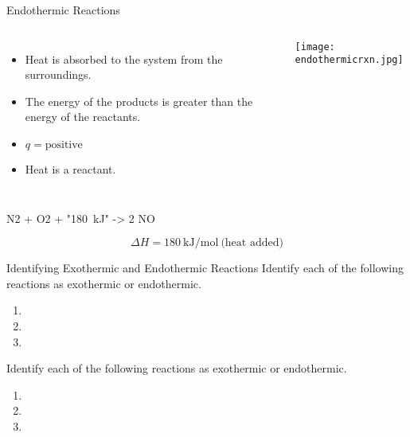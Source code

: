 \documentclass[handout]{beamer}
\begin{document}

\begin{frame}{Endothermic Reactions}
	\begin{columns}
		\begin{itemize}
			\item Heat is absorbed to the system from the
				surroundings.
			\item The energy of the products is greater than the
				energy of the reactants.
			\item $q = \text{positive}$
			\item Heat is a \alert{reactant}.
		\end{itemize}
		\begin{center}
			\texttt{[image: endothermicrxn.jpg]}
		\end{center}
	\end{columns}

	\bigskip

	\begin{reaction*}
		N2\gas{} + O2\gas{} + "\SI{180}{\kilo\joule}" -> 2
		NO\gas{}
	\end{reaction*}
	\begin{equation*}
		\Delta H = \SI{180}{\kilo\joule\per\mole}~\text{(heat
		added)}
	\end{equation*}
\end{frame}


\begin{frame}[t]{Identifying Exothermic and Endothermic Reactions}
	Identify each of the following reactions as exothermic or endothermic.
	\begin{enumerate}
		\item {}
		\item {}
		\item {}
	\end{enumerate}
\end{frame}


\begin{onyourown}[0em]
	Identify each of the following reactions as exothermic or endothermic.
	\begin{enumerate}
		\item {}
		\item {}
		\item {}
	\end{enumerate}
\end{onyourown}
\end{document}
